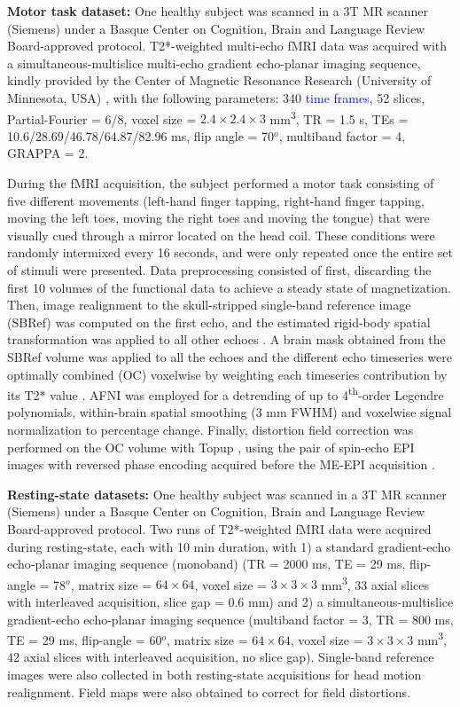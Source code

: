 \textbf{Motor task dataset:} One healthy subject was scanned in a 3T MR scanner
(Siemens) under a Basque Center on Cognition, Brain and Language Review
Board-approved protocol. T2*-weighted multi-echo fMRI data was acquired with a
simultaneous-multislice multi-echo gradient echo-planar imaging sequence, kindly
provided by the Center of Magnetic Resonance Research (University of Minnesota,
USA) \citep{Feinberg_2010,Moeller_2010,Setsompop_2011}, with the following
parameters: 340 \textcolor{blue}{time frames}, 52 slices, Partial-Fourier =
6/8, voxel size = $2.4\times2.4\times3$ mm\textsuperscript{3}, TR = 1.5 s, TEs =
10.6/28.69/46.78/64.87/82.96 ms, flip angle = 70\(^o\), multiband factor = 4,
GRAPPA = 2.

During the fMRI acquisition, the subject performed a motor task consisting of
five different movements (left-hand finger tapping, right-hand finger tapping,
moving the left toes, moving the right toes and moving the tongue) that were
visually cued through a mirror located on the head coil. These conditions were
randomly intermixed every 16 seconds, and were only repeated once the entire set
of stimuli were presented. Data preprocessing consisted of first, discarding the
first 10 volumes of the functional data to achieve a steady state of
magnetization. Then, image realignment to the skull-stripped single-band
reference image (SBRef) was computed on the first echo, and the estimated
rigid-body spatial transformation was applied to all other echoes
\citep{Jenkinson2012FSL,Jenkinson_2001}. A brain mask obtained from the SBRef
volume was applied to all the echoes and the different echo timeseries were
optimally combined (OC) voxelwise by weighting each timeseries contribution by
its T2* value \citep{Posse_1999}. AFNI \citep{Cox1996AFNISoftwareAnalysis} was
employed for a detrending of up to 4\textsuperscript{th}-order Legendre
polynomials, within-brain spatial smoothing (3 mm FWHM) and voxelwise signal
normalization to percentage change. Finally, distortion field correction was
performed on the OC volume with Topup \citep{Andersson_2003}, using the pair of
spin-echo EPI images with reversed phase encoding acquired before the ME-EPI
acquisition \citep{Glasser_2016}.

\textbf{Resting-state datasets:} One healthy subject was scanned in a 3T MR
scanner (Siemens) under a Basque Center on Cognition, Brain and Language Review
Board-approved protocol. Two runs of T2*-weighted fMRI data were acquired during
resting-state, each with 10 min duration, with 1) a standard gradient-echo
echo-planar imaging sequence (monoband) (TR = 2000 ms, TE = 29 ms, flip-angle =
78\(^o\), matrix size = $64\times64$, voxel size = $3\times3\times3$
mm\textsuperscript{3}, 33 axial slices with interleaved acquisition, slice gap =
0.6 mm) and 2) a  simultaneous-multislice gradient-echo echo-planar imaging
sequence (multiband factor = 3, TR = 800 ms, TE = 29 ms, flip-angle = 60\(^o\),
matrix size = $64\times64$, voxel size = $3\times3\times3$
mm\textsuperscript{3}, 42 axial slices with interleaved acquisition, no slice
gap). Single-band reference images were also collected in both resting-state
acquisitions for head motion realignment. Field maps were also obtained to
correct for field distortions.


